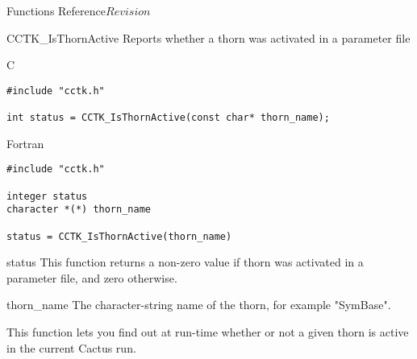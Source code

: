 \begin{cactuspart}{ Functions Reference}{}{$Revision$}
\begin{FunctionDescription}{CCTK\_IsThornActive}
\label{CCTK-IsThornActive}
Reports whether a thorn was activated in a parameter file

\begin{SynopsisSection}
\begin{Synopsis}{C}
\begin{verbatim}
#include "cctk.h"

int status = CCTK_IsThornActive(const char* thorn_name);
\end{verbatim}
\end{Synopsis}
\begin{Synopsis}{Fortran}
\begin{verbatim}
#include "cctk.h"

integer status
character *(*) thorn_name

status = CCTK_IsThornActive(thorn_name)
\end{verbatim}
\end{Synopsis}
\end{SynopsisSection}

\begin{ResultSection}
\begin{Result}{status}
This function returns a non-zero value if thorn
 was activated in a parameter file,
and zero otherwise.
\end{Result}
\end{ResultSection}

\begin{ParameterSection}
\begin{Parameter}{thorn\_name}
The character-string name of the thorn, for example "SymBase".
\end{Parameter}
\end{ParameterSection}

\begin{Discussion}
This function lets you find out at run-time whether or not a given
thorn is active in the current Cactus run.
\end{Discussion}

\end{FunctionDescription}


\end{cactuspart}
